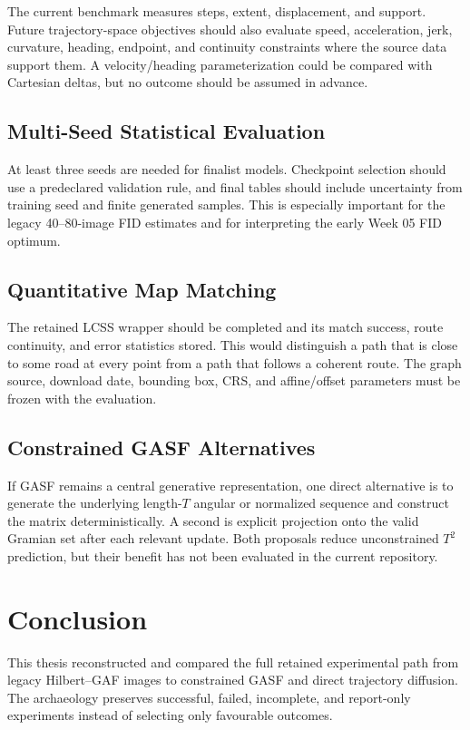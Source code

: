 \documentclass[12pt,a4paper,oneside]{report}
\begin{document}
The current benchmark measures steps, extent, displacement, and support. Future trajectory-space objectives should also evaluate speed, acceleration, jerk, curvature, heading, endpoint, and continuity constraints where the source data support them. A velocity/heading parameterization could be compared with Cartesian deltas, but no outcome should be assumed in advance.

\section{Multi-Seed Statistical Evaluation}

At least three seeds are needed for finalist models. Checkpoint selection should use a predeclared validation rule, and final tables should include uncertainty from training seed and finite generated samples. This is especially important for the legacy 40--80-image FID estimates and for interpreting the early Week 05 FID optimum.

\section{Quantitative Map Matching}

The retained LCSS wrapper should be completed and its match success, route continuity, and error statistics stored. This would distinguish a path that is close to some road at every point from a path that follows a coherent route. The graph source, download date, bounding box, CRS, and affine/offset parameters must be frozen with the evaluation.

\section{Constrained GASF Alternatives}

If GASF remains a central generative representation, one direct alternative is to generate the underlying length-$T$ angular or normalized sequence and construct the matrix deterministically. A second is explicit projection onto the valid Gramian set after each relevant update. Both proposals reduce unconstrained $T^2$ prediction, but their benefit has not been evaluated in the current repository.

\chapter{Conclusion}
\label{chap:conclusion}

This thesis reconstructed and compared the full retained experimental path from legacy Hilbert--GAF images to constrained GASF and direct trajectory diffusion. The archaeology preserves successful, failed, incomplete, and report-only experiments instead of selecting only favourable outcomes.
\end{document}
